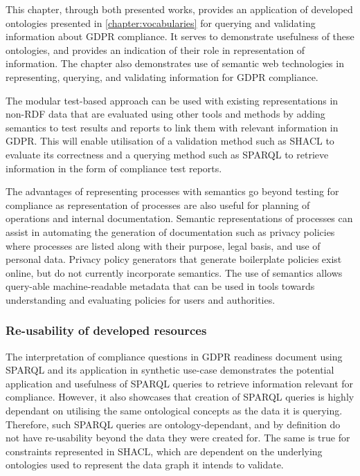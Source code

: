 This chapter, through both presented works, provides an application of developed ontologies presented in \autoref{chapter:vocabularies} for querying and validating information about GDPR compliance.
It serves to demonstrate usefulness of these ontologies, and provides an indication of their role in representation of information.
The chapter also demonstrates use of semantic web technologies in representing, querying, and validating information for GDPR compliance.

The modular test-based approach can be used with existing representations in non-RDF data that are evaluated using other tools and methods by adding semantics to test results and reports to link them with relevant information in GDPR. This will enable utilisation of a validation method such as SHACL to evaluate its correctness and a querying method such as SPARQL to retrieve information in the form of compliance test reports. 

The advantages of representing processes with semantics go beyond testing for compliance as representation of processes are also useful for planning of operations and internal documentation. Semantic representations of processes can assist in automating the generation of documentation such as privacy policies where processes are listed along with their purpose, legal basis, and use of personal data. Privacy policy generators that generate boilerplate policies exist online, but do not currently incorporate semantics. The use of semantics allows query-able machine-readable metadata that can be used in tools towards understanding and evaluating policies for users and authorities.

\subsubsection*{Re-usability of developed resources}
The interpretation of compliance questions in GDPR readiness document using SPARQL and its application in synthetic use-case demonstrates the potential application and usefulness of SPARQL queries to retrieve information relevant for compliance.
However, it also showcases that creation of SPARQL queries is highly dependant on utilising the same ontological concepts as the data it is querying. Therefore, such SPARQL queries are ontology-dependant, and by definition do not have re-usability beyond the data they were created for.
The same is true for constraints represented in SHACL, which are dependent on the underlying ontologies used to represent the data graph it intends to validate.

